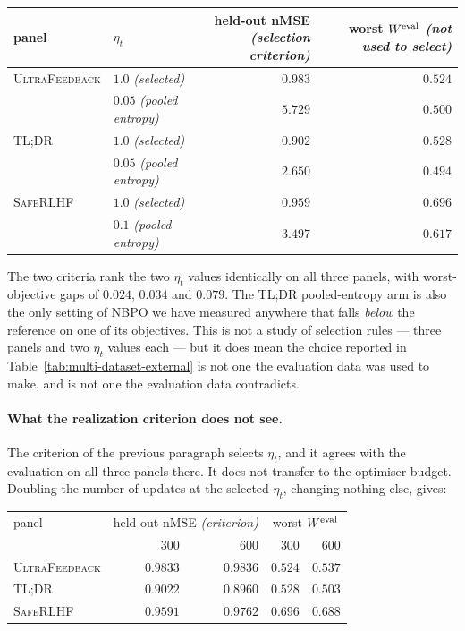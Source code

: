 \documentclass{article}
\theoremstyle{remark}
\theoremstyle{plain}
\newcommand{\NBPO}{\textsc{NBPO}}
\begin{document}
\begin{center}\footnotesize
\setlength{\tabcolsep}{4pt}
\begin{tabular}{llrr}
\toprule
panel & $\eta_t$ & \shortstack[r]{held-out nMSE\\\emph{(selection criterion)}} & \shortstack[r]{worst $W^{\rm eval}$\\\emph{(not used to select)}}\\
\midrule
\textsc{UltraFeedback} & $1.0$ \emph{(selected)} & $\mathbf{0.983}$ & $\mathbf{0.524}$\\
 & $0.05$ \emph{(pooled entropy)} & $5.729$ & $0.500$\\
\textsc{TL;DR} & $1.0$ \emph{(selected)} & $\mathbf{0.902}$ & $\mathbf{0.528}$\\
 & $0.05$ \emph{(pooled entropy)} & $2.650$ & $0.494$\\
\textsc{SafeRLHF} & $1.0$ \emph{(selected)} & $\mathbf{0.959}$ & $\mathbf{0.696}$\\
 & $0.1$ \emph{(pooled entropy)} & $3.497$ & $0.617$\\
\bottomrule
\end{tabular}
\end{center}

The two criteria rank the two $\eta_t$ values identically on all three panels, with worst-objective
gaps of $0.024$, $0.034$ and $0.079$. The \textsc{TL;DR} pooled-entropy arm is also the only setting
of \NBPO{} we have measured anywhere that falls \emph{below} the reference on one of its objectives.
This is not a study of selection rules --- three panels and two $\eta_t$ values each --- but it does
mean the choice reported in Table~\ref{tab:multi-dataset-external} is not one the evaluation data
was used to make, and is not one the evaluation data contradicts.

\paragraph{What the realization criterion does not see.}
The criterion of the previous paragraph selects $\eta_t$, and it agrees with the evaluation on all
three panels there. It does not transfer to the optimiser budget. Doubling the number of updates at
the selected $\eta_t$, changing nothing else, gives:

\begin{center}\footnotesize
\setlength{\tabcolsep}{5pt}
\begin{tabular}{lrrrr}
\toprule
panel & \multicolumn{2}{c}{held-out nMSE \emph{(criterion)}} & \multicolumn{2}{c}{worst $W^{\rm eval}$}\\
\cmidrule(lr){2-3}\cmidrule(lr){4-5}
 & $300$ & $600$ & $300$ & $600$\\
\midrule
\textsc{UltraFeedback} & $\mathbf{0.9833}$ & $0.9836$ & $0.524$ & $\mathbf{0.537}$\\
\textsc{TL;DR} & $0.9022$ & $\mathbf{0.8960}$ & $\mathbf{0.528}$ & $0.503$\\
\textsc{SafeRLHF} & $\mathbf{0.9591}$ & $0.9762$ & $\mathbf{0.696}$ & $0.688$\\
\bottomrule
\end{tabular}
\end{center}
\end{document}
